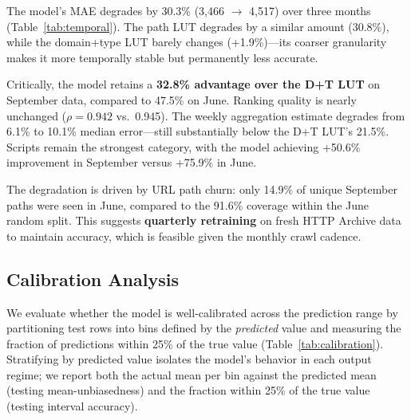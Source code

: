 \documentclass[sigconf,nonacm]{acmart}
\begin{document}
The model's MAE degrades by 30.3\% (3,466 $\to$ 4,517) over three months (Table~\ref{tab:temporal}).
The path LUT degrades by a similar amount (30.8\%), while the domain+type LUT barely changes (+1.9\%)---its coarser granularity makes it more temporally stable but permanently less accurate.

Critically, the model retains a \textbf{32.8\% advantage over the D+T LUT} on September data, compared to 47.5\% on June.
Ranking quality is nearly unchanged ($\rho = 0.942$ vs.\ 0.945).
The weekly aggregation estimate degrades from 6.1\% to 10.1\% median error---still substantially below the D+T LUT's 21.5\%.
Scripts remain the strongest category, with the model achieving +50.6\% improvement in September versus +75.9\% in June.

The degradation is driven by URL path churn: only 14.9\% of unique September paths were seen in June, compared to the 91.6\% coverage within the June random split.
This suggests \textbf{quarterly retraining} on fresh HTTP Archive data to maintain accuracy, which is feasible given the monthly crawl cadence.

\subsection{Calibration Analysis}
\label{sec:calibration}

We evaluate whether the model is well-calibrated across the prediction range by partitioning test rows into bins defined by the \emph{predicted} value and measuring the fraction of predictions within 25\% of the true value (Table~\ref{tab:calibration}). Stratifying by predicted value isolates the model's behavior in each output regime; we report both the actual mean per bin against the predicted mean (testing mean-unbiasedness) and the fraction within 25\% of the true value (testing interval accuracy).
\end{document}
